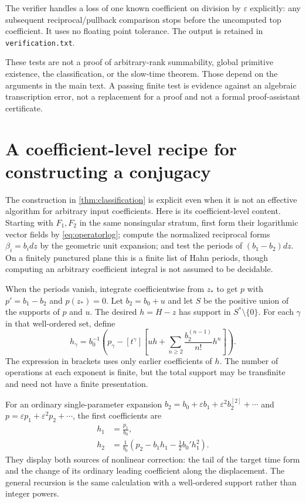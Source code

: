 \documentclass[11pt,a4paper]{article}
\numberwithin{equation}{section}
\theoremstyle{definition}
\theoremstyle{remark}
\newcommand{\eps}{\varepsilon}
\begin{document}
The verifier handles a loss of one known coefficient on division by
$\eps$ explicitly: any subsequent reciprocal/pullback comparison stops
before the uncomputed top coefficient.  It uses no floating point tolerance.
The output is retained in \texttt{verification.txt}.

These tests are not a proof of arbitrary-rank summability, global primitive
existence, the classification, or the slow-time theorem.  Those depend on
the arguments in the main text.  A passing finite test is evidence against
an algebraic transcription error, not a replacement for a proof and not a
formal proof-assistant certificate.

\appendix
\section{A coefficient-level recipe for constructing a conjugacy}
\label{app:recipe}

The construction in \cref{thm:classification} is explicit even when it is
not an effective algorithm for arbitrary input coefficients.  Here is its
coefficient-level content.  Starting with $F_1,F_2$ in the same nonsingular
stratum, first form their logarithmic vector fields by
\eqref{eq:operatorlog}; compute the normalized reciprocal forms
$\beta_i=b_i dz$ by the geometric unit expansion; and test the periods of
$(b_1-b_2)dz$.  On a finitely punctured plane this is a finite list of Hahn
periods, though computing an arbitrary coefficient integral is not assumed
to be decidable.

When the periods vanish, integrate coefficientwise from $z_*$ to get
$p$ with $p'=b_1-b_2$ and $p(z_*)=0$.  Let $b_2=b_0+u$ and let $S$
be the positive union of the supports of $p$ and $u$.  The desired
$h=H-z$ has support in $S^*\setminus\{0\}$.  For each $\gamma$ in that
well-ordered set, define
\begin{equation}\label{eq:explicit-recursion}
 h_\gamma=b_0^{-1}\left(
 p_\gamma-[t^\gamma]\left[
 uh+\sum_{n\geq2}\frac{b_2^{(n-1)}}{n!}h^n
 \right]\right).
\end{equation}
The expression in brackets uses only earlier coefficients of $h$.
The number of operations at each exponent is finite, but the total support
may be transfinite and need not have a finite presentation.

For an ordinary single-parameter expansion
$b_2=b_0+\eps b_1+\eps^2b_2^{[2]}+\cdots$ and
$p=\eps p_1+\eps^2p_2+\cdots$, the first coefficients are
\begin{align*}
 h_1&=\frac{p_1}{b_0},\\
 h_2&=\frac1{b_0}\left(p_2-b_1h_1-\frac12b_0'h_1^2\right).
\end{align*}
They display both sources of nonlinear correction: the tail of the target
time form and the change of its ordinary leading coefficient along the
displacement.  The general recursion is the same calculation with a
well-ordered support rather than integer powers.
\end{document}
